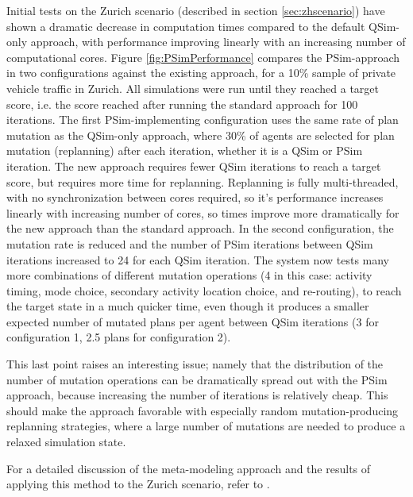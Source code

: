 Initial tests on the Zurich scenario (described in section \ref{sec:zhscenario}) have shown a dramatic decrease in computation times compared to the default QSim-only approach, with performance improving linearly with an increasing number of computational cores.
Figure \ref{fig:PSimPerformance} compares the PSim-approach in two configurations against the existing approach, for a 10\% sample of private vehicle traffic in Zurich. All simulations were run until they reached a target score, i.e. the score reached after running the standard approach for 100 iterations. The first PSim-implementing configuration uses the same rate of plan mutation as the QSim-only approach, where 30\% of agents are selected for plan mutation (replanning) after each iteration, whether it is a QSim or PSim iteration. The new approach requires fewer QSim iterations to reach a target score, but requires more time for replanning. Replanning is fully multi-threaded, with no synchronization between cores required, so it’s performance increases linearly with increasing number of cores, so times improve more dramatically for the new approach than the standard approach.
In the second configuration, the mutation rate is reduced and the number of PSim iterations between QSim iterations increased to 24 for each QSim iteration. The system now tests many more combinations of different mutation operations (4 in this case: activity timing, mode choice, secondary activity location choice, and re-routing), to reach the target state in a much quicker time, even though it produces a smaller expected number of mutated plans per agent between QSim iterations (3 for configuration 1, 2.5 plans for configuration 2).

This last point raises an interesting issue; namely that the distribution of the number of mutation operations can be dramatically spread out with the PSim approach, because increasing the number of iterations is relatively cheap. This should make the approach favorable with especially random mutation-producing replanning strategies, where a large number of mutations are needed to produce a relaxed simulation state.

For a detailed discussion of the meta-modeling approach and the results of applying this method to the Zurich scenario, refer to \citet[][]{FourieEtAl_TRR_2013}.

